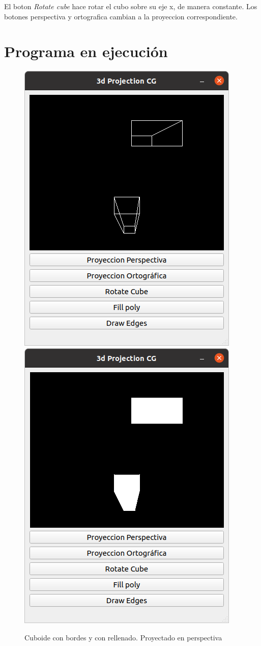 \documentclass[12pt]{article}
\begin{document}
El boton \textit{Rotate cube} hace rotar el cubo sobre su eje x, de manera constante.
Los botones perspectiva y ortografica cambian a la proyeccion correspondiente.




\section{Programa en ejecución}

\begin{figure}[H]
\centering
\includegraphics[scale=0.5]{images/gui.png}
\includegraphics[scale=0.5]{images/ej2.png}
\caption{Cuboide con bordes y con rellenado. Proyectado en perspectiva}
\end{figure}
\end{document}
